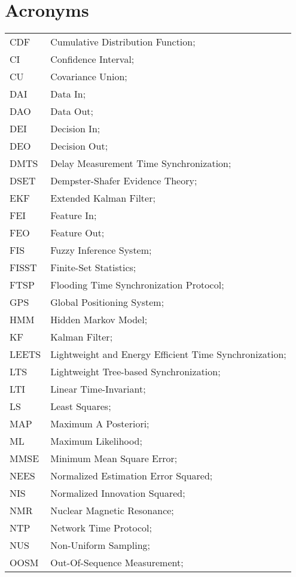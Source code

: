 \newpage
\section*{Acronyms}
\begin{longtable}{ll}
	CDF			& Cumulative Distribution Function; \\
	CI			& Confidence Interval; \\
	CU			& Covariance Union; \\
	DAI			& Data In; \\
	DAO			& Data Out; \\
	DEI			& Decision In; \\
	DEO 		& Decision Out; \\
	DMTS		& Delay Measurement Time Synchronization; \\
	DSET 		& Dempster-Shafer Evidence Theory; \\		
	EKF			& Extended Kalman Filter; \\
	FEI			& Feature In; \\
	FEO			& Feature Out; \\
	FIS			& Fuzzy Inference System; \\
	FISST		& Finite-Set Statistics; \\
	FTSP		& Flooding Time Synchronization Protocol; \\
	GPS			& Global Positioning System; \\
	HMM			& Hidden Markov Model; \\
	KF 			& Kalman Filter; \\
	LEETS		& Lightweight and Energy Efficient Time Synchronization; \\
	LTS			& Lightweight Tree-based Synchronization; \\
	LTI			& Linear Time-Invariant; \\
	LS			& Least Squares; \\
	MAP			& Maximum A Posteriori; \\
	ML			& Maximum Likelihood; \\
	MMSE		& Minimum Mean Square Error; \\
	NEES		& Normalized Estimation Error Squared; \\
	NIS			& Normalized Innovation Squared; \\
	NMR 		& Nuclear Magnetic Resonance; \\
	NTP			& Network Time Protocol; \\
	NUS 		& Non-Uniform Sampling; \\ 
	OOSM 		& Out-Of-Sequence Measurement; \\

\end{longtable}
